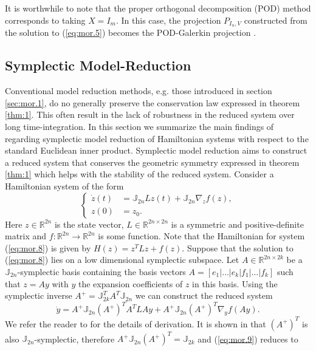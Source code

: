 It is worthwhile to note that the proper orthogonal decomposition (POD) method \cite{hesthaven2015certified} corresponds to taking $X = I_m$. In this case, the projection $P_{I_n,V}$ constructed from the solution to (\ref{eq:mor.5}) becomes the POD-Galerkin projection \cite{hesthaven2015certified}.

\subsection{Symplectic Model-Reduction} \label{sec:mor.2}
Conventional model reduction methods, e.g. those introduced in section \ref{sec:mor.1}, do no generally preserve the conservation law expressed in theorem \ref{thm:1}. This often result in the lack of robustness in the reduced system over long time-integration. In this section we summarize the main findings of \cite{doi:10.1137/17M1111991} regarding symplectic model reduction of Hamiltonian systems with respect to the standard Euclidean inner product. Symplectic model reduction aims to construct a reduced system that conserves the geometric symmetry expressed in theorem \ref{thm:1} which helps with the stability of the reduced system.
Consider a Hamiltonian system of the form
\begin{equation} \label{eq:mor.8}
\left\{
\begin{aligned}
	\dot z(t) &= \mathbb J_{2n} L z(t) + \mathbb J_{2n} \nabla_z f(z), \\
	z(0) &= z_0.
\end{aligned}
\right.
\end{equation}
Here $z\in \mathbb R^{2n}$ is the state vector, $L\in\mathbb R^{2n\times 2n}$ is a symmetric and positive-definite matrix and $f:\mathbb R^{2n}\to\mathbb R^{2n}$ is some function. Note that the Hamiltonian for system (\ref{eq:mor.8}) is given by $H(z) = z^TLz + f(z)$. Suppose that the solution to (\ref{eq:mor.8}) lies on a low dimensional symplectic subspace. Let $A\in \mathbb{R}^{2n\times 2k}$ be a $\mathbb{J}_{2n}$-symplectic basis containing the basis vectors $A=[e_1|\dots|e_k|f_1|\dots|f_k]$ such that $z = Ay$ with $y$ the expansion coefficients of $z$ in this basis. Using the symplectic inverse $A^+ = \mathbb J_{2k}^T A^T \mathbb J_{2n}$ we can construct the reduced system
\begin{equation} \label{eq:mor.9}
	\dot y = A^+ \mathbb J_{2n} (A^+)^T A^T L A y + A^+ \mathbb J_{2n} (A^+)^T \nabla_y f(Ay).
\end{equation}
We refer the reader to \cite{doi:10.1137/17M1111991} for the details of derivation. It is shown in \cite{doi:10.1137/140978922} that $(A^+)^T$ is also $\mathbb J_{2n}$-symplectic, therefore $A^+ \mathbb J_{2n} (A^+)^T = \mathbb J_{2k}$ and (\ref{eq:mor.9}) reduces to
